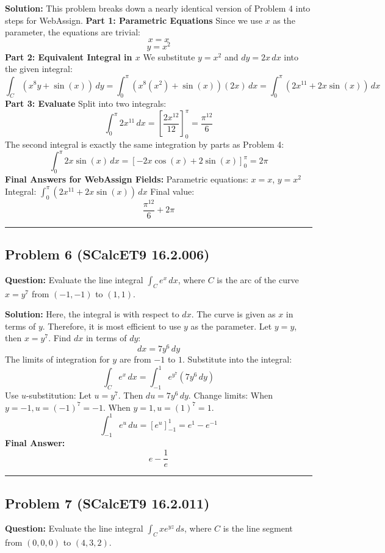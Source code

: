 \documentclass{article}
\begin{document}
\textbf{Solution:}
This problem breaks down a nearly identical version of Problem 4 into steps for WebAssign.
\textbf{Part 1: Parametric Equations}
Since we use $x$ as the parameter, the equations are trivial:
\[ x = x \]
\[ y = x^2 \]
\textbf{Part 2: Equivalent Integral in $x$}
We substitute $y = x^2$ and $dy = 2x \, dx$ into the given integral:
\[ \int_C (x^8y + \sin(x)) \, dy = \int_0^\pi (x^8(x^2) + \sin(x))(2x) \, dx = \int_0^\pi (2x^{11} + 2x\sin(x)) \, dx \]
\textbf{Part 3: Evaluate}
Split into two integrals:
\[ \int_0^\pi 2x^{11} \, dx = \left[ \frac{2x^{12}}{12} \right]_0^\pi = \frac{\pi^{12}}{6} \]
The second integral is exactly the same integration by parts as Problem 4:
\[ \int_0^\pi 2x\sin(x) \, dx = \left[ -2x\cos(x) + 2\sin(x) \right]_0^\pi = 2\pi \]
\textbf{Final Answers for WebAssign Fields:} 
Parametric equations: $x = x$, $y = x^2$
Integral: $\int_0^\pi (2x^{11} + 2x\sin(x)) \, dx$
Final value: 
\[ \frac{\pi^{12}}{6} + 2\pi \]

\hrule \vspace{0.5cm}

\subsection{Problem 6 (SCalcET9 16.2.006)}
\textbf{Question:} Evaluate the line integral $\int_C e^x \, dx$, where $C$ is the arc of the curve $x = y^7$ from $(-1, -1)$ to $(1, 1)$.

\textbf{Solution:}
Here, the integral is with respect to $dx$. The curve is given as $x$ in terms of $y$. Therefore, it is most efficient to use $y$ as the parameter.
Let $y = y$, then $x = y^7$.
Find $dx$ in terms of $dy$:
\[ dx = 7y^6 \, dy \]
The limits of integration for $y$ are from $-1$ to $1$.
Substitute into the integral:
\[ \int_C e^x \, dx = \int_{-1}^1 e^{y^7} (7y^6 \, dy) \]
Use $u$-substitution: Let $u = y^7$. Then $du = 7y^6 \, dy$.
Change limits:
When $y = -1, u = (-1)^7 = -1$.
When $y = 1, u = (1)^7 = 1$.
\[ \int_{-1}^1 e^u \, du = \left[ e^u \right]_{-1}^1 = e^1 - e^{-1} \]
\textbf{Final Answer:} 
\[ e - \frac{1}{e} \]

\hrule \vspace{0.5cm}

\subsection{Problem 7 (SCalcET9 16.2.011)}
\textbf{Question:} Evaluate the line integral $\int_C xe^{yz} \, ds$, where $C$ is the line segment from $(0,0,0)$ to $(4,3,2)$.
\end{document}
